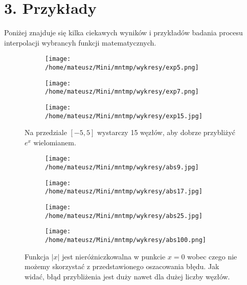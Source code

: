 \documentclass{article}
\begin{document}
	\section*{3. Przykłady}
	Poniżej znajduje się kilka ciekawych wyników i przykładów badania procesu interpolacji wybrancyh funkcji matematycznych.
	\clearpage
	\begin{figure}
		\centering
		\begin{subfigure}{0.45\textwidth}
			\centering
			\texttt{[image: /home/mateusz/Mini/mntmp/wykresy/exp5.png]}
		\end{subfigure}
		\hfill
		\begin{subfigure}{0.45\textwidth}
			\centering
			\texttt{[image: /home/mateusz/Mini/mntmp/wykresy/exp7.png]}
		\end{subfigure}
		\hfill
		\begin{subfigure}{0.45\textwidth}
			\centering
			\texttt{[image: /home/mateusz/Mini/mntmp/wykresy/exp15.jpg]}
		\end{subfigure}
		\caption{Na przedziale $[-5, 5]$ wystarczy 15 węzłów, aby dobrze przybliżyć $e^x$ wielomianem.}
	\end{figure}

	\begin{figure}
		\centering
		\begin{subfigure}{0.45\textwidth}
			\centering
			\texttt{[image: /home/mateusz/Mini/mntmp/wykresy/abs9.jpg]}
		\end{subfigure}
	\hfill
		\begin{subfigure}{0.45\textwidth}
			\centering
			\texttt{[image: /home/mateusz/Mini/mntmp/wykresy/abs17.jpg]}
		\end{subfigure}
	\hfill
		\begin{subfigure}{0.45\textwidth}
			\centering
			\texttt{[image: /home/mateusz/Mini/mntmp/wykresy/abs25.jpg]}
		\end{subfigure}
	\hfill
		\begin{subfigure}{0.45\textwidth}
			\centering
			\texttt{[image: /home/mateusz/Mini/mntmp/wykresy/abs100.png]}
		\end{subfigure}
	\caption{Funkcja $|x|$ jest nieróżniczkowalna w punkcie $x=0$ wobec czego nie możemy skorzystać z przedstawionego oszacowania błędu. Jak widać, błąd przybliżenia jest duży nawet dla dużej liczby węzłów.}
	\end{figure}
\end{document}
